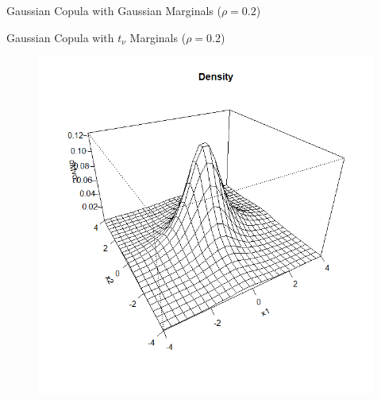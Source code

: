 \documentclass[11pt]{beamer}
\theoremstyle{plain}
\theoremstyle{definition}
\theoremstyle{remark}
\begin{document}
\begin{frame}{Gaussian Copula with Gaussian Marginals ($\rho = 0.2$)}
\begin{figure}[ht]
\begin{minipage}[b]{0.45\linewidth}
        \end{minipage}
    \end{figure}
\end{frame}
%
\begin{frame}{Gaussian Copula with $t_\nu$ Marginals ($\rho = 0.2$)}
    \begin{figure}[ht]
        \begin{minipage}[b]{0.45\linewidth}
            \centering
            \includegraphics[width=\textwidth]{fig/gauss_t_density_0_2.png}
        \end{minipage}
        \hspace{0.5cm}
        \begin{minipage}[b]{0.45\linewidth}
            \centering

\end{minipage}
\end{figure}
\end{frame}
\end{document}
